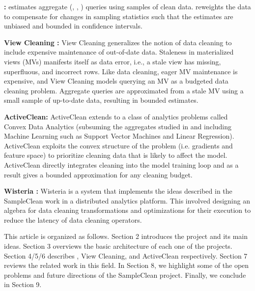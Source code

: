 \vspace{0.5em}
\noindent \textbf{\sampleclean \cite{wang1999sample}: } \sampleclean estimates aggregate (\sumfunc, \countfunc, \avgfunc) queries using samples of clean data. \sampleclean reweights the data to compensate for changes in sampling statistics such that the estimates are unbiased and bounded in confidence intervals.

\vspace{0.5em}
\noindent \textbf{View Cleaning \cite{krishnan2015svc}: } View Cleaning generalizes the notion of data cleaning to include expensive maintenance of out-of-date data. Staleness in materialized views (MVs) manifests itself as data error, i.e., a stale view has missing, superfluous, and incorrect rows.
Like data cleaning, eager MV maintenance is expensive, and View Cleaning models querying an MV as a budgeted data cleaning problem.
Aggregate queries are approximated from a stale MV using a small sample of up-to-date data, resulting in bounded estimates.

\vspace{0.5em}
\noindent \textbf{ActiveClean: } ActiveClean extends \sampleclean to a class of analytics problems called Convex Data Analytics (subsuming the aggregates studied in \sampleclean and including Machine Learning such as Support Vector Machines and Linear Regression). ActiveClean exploits the convex structure of the problem (i.e. gradients and feature space) to prioritize cleaning data that is likely to affect the model. ActiveClean directly integrates cleaning into the model training loop and as a result gives a bounded approximation for any cleaning budget.

\vspace{0.5em}
\noindent \textbf{Wisteria \cite{haas2015wisteria}: } Wisteria is a system that implements the ideas described in the SampleClean work in a distributed analytics platform. This involved designing an algebra for data cleaning transformations and optimizations for their execution to reduce the latency of data cleaning operators.

\vspace{0.5em}

This article is organized as follows. Section 2 introduces the project and its main ideas. Section 3 overviews the basic architecture of each one of the projects. Section 4/5/6 describes \sampleclean, View Cleaning, and ActiveClean respectively. Section 7 reviews the related work in this field. In Section 8, we highlight some of the open problems and future directions of the SampleClean project. Finally, we conclude in Section 9.